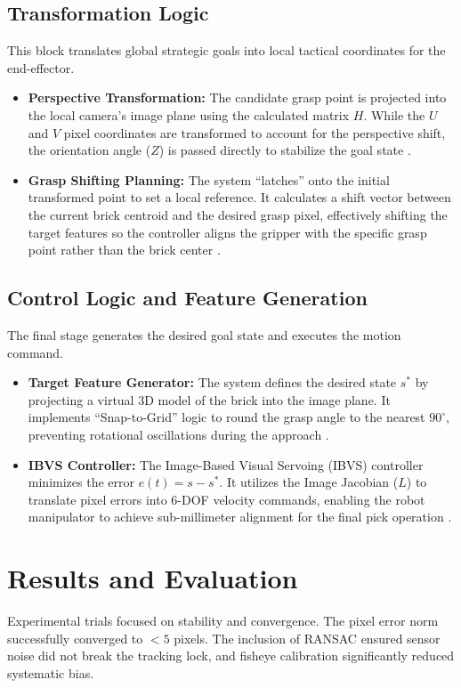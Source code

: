 \documentclass{article}
\begin{document}
\subsection{Transformation Logic}
This block translates global strategic goals into local tactical coordinates for the end-effector.
\begin{itemize}
    \item \textbf{Perspective Transformation:} The candidate grasp point is projected into the local camera's image plane using the calculated matrix $H$. While the $U$ and $V$ pixel coordinates are transformed to account for the perspective shift, the orientation angle ($Z$) is passed directly to stabilize the goal state .
    \item \textbf{Grasp Shifting Planning:} The system ``latches'' onto the initial transformed point to set a local reference. It calculates a shift vector between the current brick centroid and the desired grasp pixel, effectively shifting the target features so the controller aligns the gripper with the specific grasp point rather than the brick center .
\end{itemize}

\subsection{Control Logic and Feature Generation}
The final stage generates the desired goal state and executes the motion command.
\begin{itemize}
    \item \textbf{Target Feature Generator:} The system defines the desired state $s^*$ by projecting a virtual 3D model of the brick into the image plane. It implements ``Snap-to-Grid'' logic to round the grasp angle to the nearest $90^\circ$, preventing rotational oscillations during the approach .
    \item \textbf{IBVS Controller:} The Image-Based Visual Servoing (IBVS) controller minimizes the error $e(t) = s - s^*$. It utilizes the Image Jacobian ($L$) to translate pixel errors into 6-DOF velocity commands, enabling the robot manipulator to achieve sub-millimeter alignment for the final pick operation .
\end{itemize}
\section{Results and Evaluation}
Experimental trials focused on stability and convergence. The pixel error norm successfully converged to $< 5$ pixels. The inclusion of RANSAC ensured sensor noise did not break the tracking lock, and fisheye calibration significantly reduced systematic bias.
\end{document}
